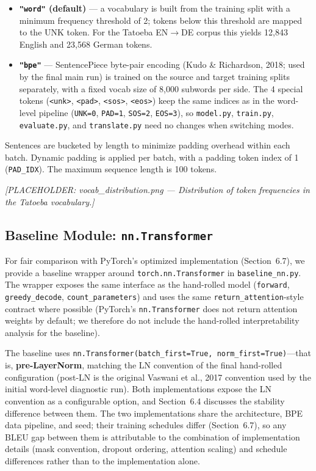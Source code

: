 \begin{itemize}
\item \textbf{\texttt{"word"} (default)} --- a vocabulary is built from the training split with a minimum frequency threshold of 2; tokens below this threshold are mapped to the UNK token. For the Tatoeba EN$\rightarrow$DE corpus this yields 12,843 English and 23,568 German tokens.
\item \textbf{\texttt{"bpe"}} --- SentencePiece byte-pair encoding (Kudo \& Richardson, 2018; used by the final main run) is trained on the source and target training splits separately, with a fixed vocab size of 8,000 subwords per side. The 4 special tokens (\texttt{<unk>}, \texttt{<pad>}, \texttt{<sos>}, \texttt{<eos>}) keep the same indices as in the word-level pipeline (\texttt{UNK=0}, \texttt{PAD=1}, \texttt{SOS=2}, \texttt{EOS=3}), so \texttt{model.py}, \texttt{train.py}, \texttt{evaluate.py}, and \texttt{translate.py} need no changes when switching modes.
\end{itemize}

Sentences are bucketed by length to minimize padding overhead within each batch. Dynamic padding is applied per batch, with a padding token index of 1 (\texttt{PAD\_IDX}). The maximum sequence length is 100 tokens.

\textit{[PLACEHOLDER: vocab\_distribution.png --- Distribution of token frequencies in the Tatoeba vocabulary.]}

\subsection{Baseline Module: \texttt{nn.Transformer}}

For fair comparison with PyTorch's optimized implementation (Section~6.7), we provide a baseline wrapper around \texttt{torch.nn.Transformer} in \texttt{baseline\_nn.py}. The wrapper exposes the same interface as the hand-rolled model (\texttt{forward}, \texttt{greedy\_decode}, \texttt{count\_parameters}) and uses the same \texttt{return\_attention}-style contract where possible (PyTorch's \texttt{nn.Transformer} does not return attention weights by default; we therefore do not include the hand-rolled interpretability analysis for the baseline).

The baseline uses \texttt{nn.Transformer(batch\_first=True, norm\_first=True)}---that is, \textbf{pre-LayerNorm}, matching the LN convention of the final hand-rolled configuration (post-LN is the original Vaswani et al., 2017 convention used by the initial word-level diagnostic run). Both implementations expose the LN convention as a configurable option, and Section~6.4 discusses the stability difference between them. The two implementations share the architecture, BPE data pipeline, and seed; their training schedules differ (Section~6.7), so any BLEU gap between them is attributable to the combination of implementation details (mask convention, dropout ordering, attention scaling) and schedule differences rather than to the implementation alone.
